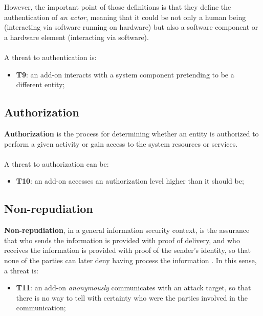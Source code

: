 However, the important point of those definitions is that they define the authentication of \textit{an actor}, meaning that it could be not only a human being (interacting via software running on hardware) but also a software component or a hardware element (interacting via software).\\
\\
A threat to authentication is:
\begin{itemize}
    \item \textbf{T9}: an add-on interacts with a system component pretending to be a different entity;
\end{itemize}



\subsection{Authorization}
\label{t10}
\textbf{Authorization} is the process for determining whether an entity is authorized to perform a given activity or gain access to the system resources or services.\\
\\
A threat to authorization can be:

\begin{itemize}
    \item \textbf{T10}: an add-on accesses an authorization level higher than it should be;
\end{itemize}




\subsection{Non-repudiation}
\label{t11}
\textbf{Non-repudiation}, in a general information security context, is the assurance that who sends the information is provided with proof of delivery, and who receives the information is provided with proof of the sender's identity, so that none of the parties can later deny having process the information \cite{nist800-57-p2}. In this sense, a threat is:

\begin{itemize}
    \item \textbf{T11}: an add-on \textit{anonymously} communicates with an attack target, so that there is no way to tell with certainty who were the parties involved in the communication;
\end{itemize}



